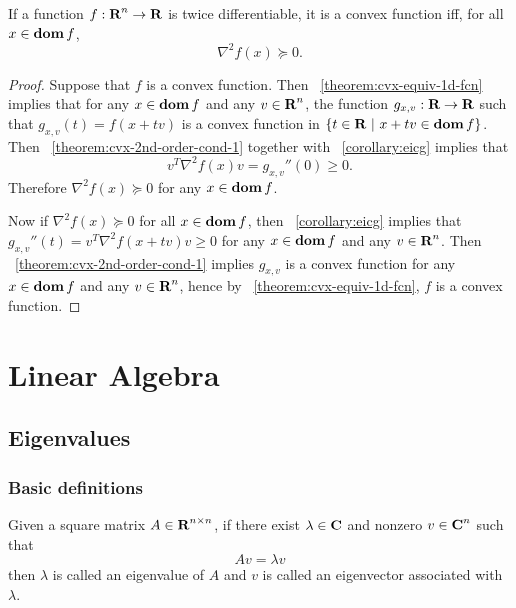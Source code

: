 \documentclass[10pt, twoside]{book}   	%
\begin{document}
\begin{theorem}
\label{theorem:cvx-2nd-order-cond}
If a function $f:{\mbox{\bf R}}^n\to{\mbox{\bf R}}$ is twice differentiable, it is a convex function iff, for all $x \in \mathop{\bf dom} f$,
\begin{equation}
\label{eq:cvx-2nd-order-cond}
        \nabla^2 f(x) \succeq 0.
\end{equation}
\end{theorem}

\begin{proof}
Suppose that $f$ is a convex function.
Then \theoremname~\ref{theorem:cvx-equiv-1d-fcn} implies that
for any $x\in\mathop{\bf dom} f$ and any $v\in{\mbox{\bf R}}^n$,
the function $g_{x,v}:{\mbox{\bf R}}\to{\mbox{\bf R}}$ such that $g_{x,v}(t) = f(x+tv)$
is a convex function in $\{t\in{\mbox{\bf R}}~|~x+tv \in \mathop{\bf dom} f\}$.
Then \theoremname~\ref{theorem:cvx-2nd-order-cond-1} together with \corollaryname~\ref{corollary:eicg}
implies that
\[
v^T \nabla^2 f(x) v = g_{x,v}''(0) \geq0.
\]
Therefore $\nabla^2 f(x) \succeq 0$ for any $x \in \mathop{\bf dom} f$.

Now if $\nabla^2 f(x) \succeq 0$ for all $x\in\mathop{\bf dom} f$,
then
\corollaryname~\ref{corollary:eicg}
implies that
$g_{x,v}''(t) = v^T \nabla^2 f(x+tv) v \geq0$ for any $x \in \mathop{\bf dom} f$ and any $v\in{\mbox{\bf R}}^n$.
Then \theoremname~\ref{theorem:cvx-2nd-order-cond-1} implies
$g_{x,v}$ is a convex function for any $x \in \mathop{\bf dom} f$ and any $v\in{\mbox{\bf R}}^n$,
hence by \theoremname~\ref{theorem:cvx-equiv-1d-fcn},
$f$ is a convex function.
\end{proof}



\chapter{Linear Algebra}
\section{Eigenvalues}

\subsection{Basic definitions}

Given a square matrix $A\in{\mbox{\bf R}}^{n\times n}$,
if there exist $\lambda \in {\mbox{\bf C}}$ and nonzero $v \in {\mbox{\bf C}}^n$ such that
\begin{equation}
        A v = \lambda v
\end{equation}
then $\lambda$ is called an eigenvalue of $A$ and $v$ is called an eigenvector associated with $\lambda$.
\end{document}
